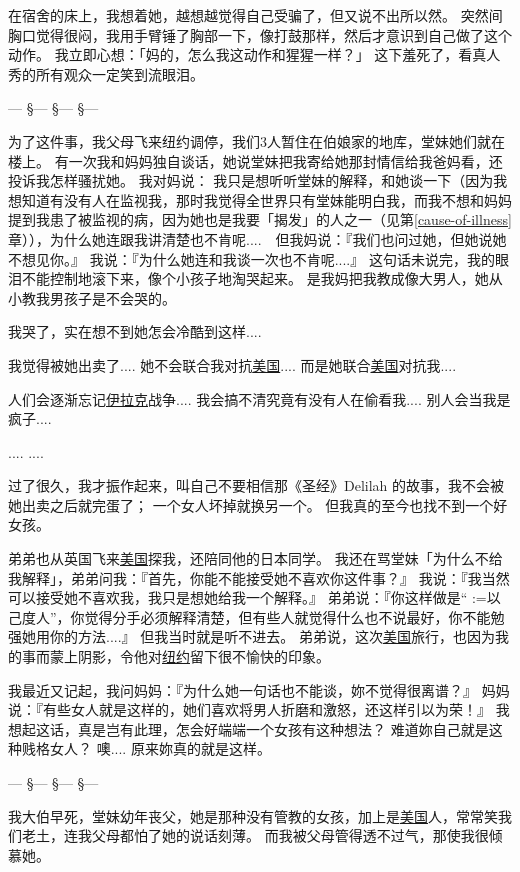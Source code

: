 \documentclass[12pt]{report}
\makeatletter
\renewcommand{\d}[1]{$\underaccent{\scalebox{0.5}{\textbullet}}{\textrm{#1}}$}
\newcommand{\ds}[1]{%
  \@tfor\next:=#1\do{\d{\next}}}
\newcommand*\vignette{\begin{center}\color{blue}  --- \quad \S \quad --- \quad \S \quad --- \quad \S \quad --- \end{center}}
\makeatother
\begin{document}
在宿舍的床上，我想着她，越想越觉得自己受骗了，但又说不出所以然。  突然间胸口觉得很闷，我用手臂锤了胸部一下，像打鼓那样，然后才意识到自己做了这个动作。  我立即心想：「妈的，怎么我这动作和猩猩一样？」  这下羞死了，看真人秀的所有观众一定笑到流眼泪。

\vignette

为了这件事，我父母飞来纽约调停，我们3人暂住在伯娘家的地库，堂妹她们就在楼上。 有一次我和妈妈独自谈话，她说堂妹把我寄给她那封情信给我爸妈看，还投诉我怎样骚扰她。 我对妈说： 我只是想听听堂妹的解释，和她谈一下（因为我想知道有没有人在监视我，那时我觉得全世界只有堂妹能明白我，而我不想和妈妈提到我患了被监视的病，因为她也是我要「揭发」的人之一（见第\ref{cause-of-illness}章）），为什么她连跟我讲清楚也不肯呢.... \,\, 但我妈说：『我们也问过她，但她说她不想见你。』  我说：『为什么她连和我谈一次也不肯呢....』 这句话未说完，我的眼泪不能控制地滚下来，像个小孩子地淘哭起来。 是我妈把我教成像大男人，她从小教我男孩子是不会哭的。

我哭了，实在想不到她怎会冷酷到这样.... 

我觉得被她出卖了....  她不会联合我对抗\underline{美国}.... 而是她联合\underline{美国}对抗我....

人们会逐渐忘记\underline{伊拉克}战争.... 我会搞不清究竟有没有人在偷看我.... 别人会当我是疯子....

.... ....

过了很久，我才振作起来，叫自己不要相信那《圣经》Delilah 的故事，我不会被她出卖之后就完蛋了； 一个女人坏掉就换另一个。  但我真的至今也找不到一个好女孩。 

弟弟也从英国飞来\underline{美国}探我，还陪同他的日本同学。 我还在骂堂妹「为什么不给我解释」，弟弟问我：『首先，你能不能接受她不喜欢你这件事？』  我说：『我当然可以接受她不喜欢我，我只是想她给我一个解释。』  弟弟说：『你这样做是``\ds{以己度人}''，你觉得分手必须解释清楚，但有些人就觉得什么也不说最好，你不能勉强她用你的方法....』 但我当时就是听不进去。 弟弟说，这次\underline{美国}旅行，也因为我的事而蒙上阴影，令他对\underline{纽约}留下很不愉快的印象。

我最近又记起，我问妈妈：『为什么她一句话也不能谈，妳不觉得很离谱？』 妈妈说：『有些女人就是这样的，她们喜欢将男人折磨和激怒，还这样引以为荣！』  我想起这话，真是岂有此理，怎会好端端一个女孩有这种想法？ 难道妳自己就是这种贱格女人？  噢.... 原来妳真的就是这样。

\vignette

我大伯早死，堂妹幼年丧父，她是那种没有管教的女孩，加上是\underline{美国}人，常常笑我们老土，连我父母都怕了她的说话刻薄。 而我被父母管得透不过气，那使我很倾慕她。
\end{document}
